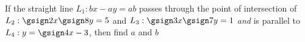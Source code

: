 



\FRACMINUS\vbfour\vbfive\vbone\vbtwo\tp\tq
\FRACMINUS\vbsix\vbfive\vbthree\vbtwo\tr\ts
\FRACDIV\tr\ts\tp\tq\ixn\ixd %
\FRACL{-\vbone}{\vbthree}\ixn\ixd\iyn\iyd
\FRACDIV\iyn\iyd{}\iyn\iyd
\MULTIPLY\ixn\iyd\tp
\MULTIPLY{\ixd}\iyn\tq
\MULTIPLY\ixd\iyd\tr
\MULTIPLY\vbseven\tp\ga
\MULTIPLY\tr\vbseven\gb
\SUBTRACT\ga\tq\aq
\FRACDIV{}\aq\gb\bq\cq


\question[2] If the straight line $L_1: bx - ay = ab$ passes through the point of intersection of 
$L_2: \gsign\vbone x \gsign\vbtwo y = \vbthree$ and $L_3: \gsign\vbfour x \gsign\vbfive y = \vbsix$ 
\textit{and} is parallel to $L_4: y = \gsign\vbseven x - \vbeight$, then find $a$ and $b$


\watchout

\ifprintanswers
\fi 

